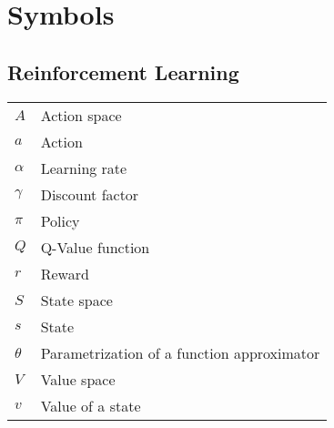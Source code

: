 
\section{Symbols}\label{sec:symbols}
\subsection{Reinforcement Learning}\label{subsec:reinforcement-learning}
\begin{tabular}{l l}
    $A$     & Action space\\
    $a$     & Action\\
    $\alpha$    & Learning rate\\
    $\gamma$    & Discount factor\\
    $\pi$   & Policy\\
    $Q$     & Q-Value function\\
    $r$     & Reward\\
    $S$     & State space\\
    $s$     & State\\
    $\theta$    & Parametrization of a function approximator\\
    $V$     & Value space\\
    $v$     & Value of a state\\
\end{tabular}